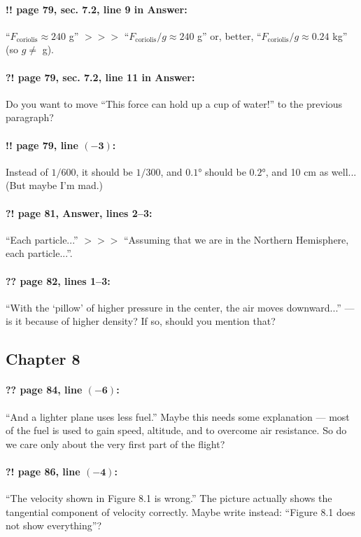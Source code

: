 \documentclass[twoside]{article}
\begin{document}
\paragraph{!! page 79, sec. 7.2, line 9 in Answer:}
“$F_{\mathrm{coriolis}}\approx 240$ g” $>\!>\!>$
“$F_{\mathrm{coriolis}}/g\approx 240$ g” or, better, “$F_{\mathrm{coriolis}}/g\approx 0.24$ kg” (so $g \ne$ g).

\paragraph{?! page 79, sec. 7.2, line 11 in Answer:} Do you want to move “This force can hold up a cup of water!” to the previous paragraph?

\paragraph{!! page 79, line $\bm{(-3)}$:} Instead of $1/600$, it should be $1/300$, and $0{.}1$° should be $0{.}2$°, and 10 cm as well... (But maybe I’m mad.)

\paragraph{?! page 81, Answer, lines 2--3:} “Each particle...” $>\!>\!>$ “Assuming that we are in the Northern Hemisphere, each particle...”.

\paragraph{?? page 82, lines 1--3:} “With the ‘pillow’ of higher pressure in the center, the air moves downward...” — is it because of higher density? If so, should you mention that?

\subsection*{Chapter 8}

\paragraph{?? page 84, line $\bm{(-6)}$:} “And a lighter plane uses less fuel.” Maybe this needs some explanation — most of the fuel is used to gain speed, altitude, and to overcome air resistance. So do we care only about the very first part of the flight?

\paragraph{?! page 86, line $\bm{(-4)}$:} “The velocity shown in Figure 8.1 is wrong.” The picture actually shows the tangential component of velocity correctly. Maybe write instead: “Figure 8.1 does not show everything”?
\end{document}
